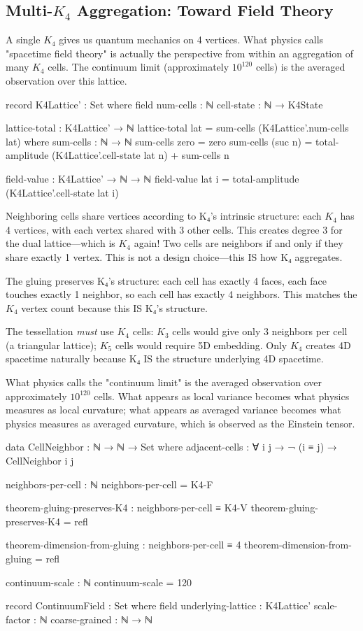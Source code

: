 \documentclass[11pt,a4paper]{book}
\begin{document}
\subsection{Multi-$K_4$ Aggregation: Toward Field Theory}

A single $K_4$ gives us quantum mechanics on 4 vertices. What physics calls "spacetime field theory" is actually the perspective from within 
an aggregation of many $K_4$ cells. The continuum limit (approximately $10^{120}$ cells) is the averaged 
observation over this lattice.

\begin{code}
record K4Lattice' : Set where
  field
    num-cells : ℕ
    cell-state : ℕ → K4State
    
lattice-total : K4Lattice' → ℕ
lattice-total lat = sum-cells (K4Lattice'.num-cells lat) 
  where
    sum-cells : ℕ → ℕ
    sum-cells zero = zero
    sum-cells (suc n) = total-amplitude (K4Lattice'.cell-state lat n) + sum-cells n

field-value : K4Lattice' → ℕ → ℕ
field-value lat i = total-amplitude (K4Lattice'.cell-state lat i)
\end{code}

Neighboring cells share vertices according to K₄'s intrinsic structure: each $K_4$ has 4 vertices, with each vertex shared with 3 other cells. This creates degree 3 for the dual lattice—which is $K_4$ again! Two cells are neighbors if and only if they share exactly 1 vertex. This is not a design choice—this IS how K₄ aggregates.

The gluing preserves K₄'s structure: each cell has exactly 4 faces, each face touches exactly 1 neighbor, so each cell has exactly 4 neighbors. This matches the $K_4$ vertex count because this IS K₄'s structure.

The tessellation \emph{must} use $K_4$ cells: $K_3$ cells would give only 3 neighbors per cell (a triangular lattice); $K_5$ cells would require 5D embedding. Only $K_4$ creates 4D spacetime naturally because K₄ IS the structure underlying 4D spacetime.

What physics calls the "continuum limit" is the averaged observation over approximately $10^{120}$ cells. What appears as local variance becomes what physics measures as local curvature; what appears as averaged variance becomes what physics measures as averaged curvature, which is observed as the Einstein tensor.

\begin{code}
data CellNeighbor : ℕ → ℕ → Set where
  adjacent-cells : ∀ i j → ¬ (i ≡ j) → CellNeighbor i j

neighbors-per-cell : ℕ
neighbors-per-cell = K4-F

theorem-gluing-preserves-K4 : neighbors-per-cell ≡ K4-V
theorem-gluing-preserves-K4 = refl

theorem-dimension-from-gluing : neighbors-per-cell ≡ 4
theorem-dimension-from-gluing = refl

continuum-scale : ℕ
continuum-scale = 120

record ContinuumField : Set where
  field
    underlying-lattice : K4Lattice'
    scale-factor : ℕ
    coarse-grained : ℕ → ℕ
\end{code}
\end{document}
